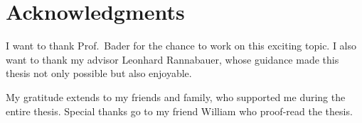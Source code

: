\thispagestyle{empty}




\chapter{Acknowledgments}
\vspace{1em}
I want to thank Prof.\ Bader for the chance to work on this exciting topic.
I also want to thank my advisor Leonhard Rannabauer, whose guidance made this thesis not only possible but also enjoyable.

My gratitude extends to my friends and family, who supported me during the entire thesis.
Special thanks go to my friend William who proof-read the thesis.
\cleardoublepage{}

